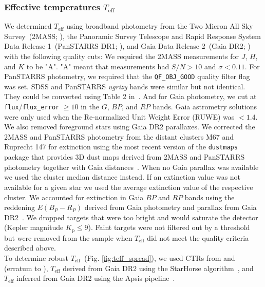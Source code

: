 \documentclass{aa}
\begin{document}
\subsubsection{Effective temperatures $T_\mathrm{eff}$}
\label{sec:sec:sec:teff}
We determined $T_\mathrm{eff}$ using broadband photometry from the Two Micron All Sky Survey~(2MASS; \citealt{skrutskie_two_2006}), the Panoramic Survey Telescope and Rapid Response System Data Release 1~(PanSTARRS DR1; \citealt{2016arXiv161205560C}), and Gaia Data Release 2~(Gaia DR2; \citealt{gaia2016, gaia2018}) with the following quality cuts: We required the 2MASS measurements for $J$, $H$, and $K$ to be "A". "A" meant that measurements had $S/N>10$ and $\sigma<0.11$. For PanSTARRS photometry, we required that the \texttt{QF\_OBJ\_GOOD} quality filter flag was set. SDSS and PanSTARRS \textit{ugrizy} bands were similar but not identical. They could be converted using Table 2 in~\citet{finkbeiner_ps1tosdss_2016}. And for Gaia photometry, we cut at \texttt{flux}/\texttt{flux\_error} $\geq 10$ in the $G$, $BP$, and $RP$ bands. Gaia astrometry solutions were only used when the Re-normalized Unit Weight Error (RUWE) was $<1.4$. We also removed foreground stars using Gaia DR2 parallaxes. We corrected the 2MASS and PanSTARRS photometry from the distant clusters M67 and Ruprecht 147 for extinction using the most recent version of the \texttt{dustmaps}~\citep{green_dustmaps_2018} package that provides 3D dust maps derived from 2MASS and PanSTARRS photometry together with Gaia distances~\citep{green2019}. When no Gaia parallax was available we used the cluster median distance instead. If an extinction value was not available for a given star we used the average extinction value of the respective cluster. We accounted for extinction in Gaia $BP$ and $RP$ bands using the reddening $E(B_P-R_P)$ derived from Gaia photometry and parallax from Gaia DR2~\citep{andrae_gaiaapsis_2018}. We dropped targets that were too bright and would saturate the detector (Kepler magnitude $K_\mathrm{p} \leq 9$). Faint targets were not filtered out by a threshold but were removed from the sample when $T_\mathrm{eff}$ did not meet the quality criteria described above.
\\
To determine robust $T_\mathrm{eff}$~(Fig. \ref{fig:teff_spread}), we used CTRs from \citet{boyajian_stellar_2013} and \citet{mann_erratum_2016} (erratum to \citealt{mann_how_2015}), $T_\mathrm{eff}$ derived from Gaia DR2 using the StarHorse algorithm~\citep{queiroz_starhorse_2018}, and $T_\mathrm{eff}$ inferred from Gaia DR2 using the Apsis pipeline~\citep{bailerjones_apsis_2013, andrae_gaiaapsis_2018}.
\end{document}
